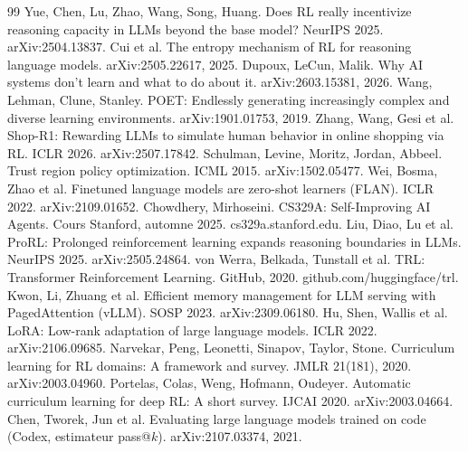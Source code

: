 \begin{thebibliography}{99}
 Yue, Chen, Lu, Zhao, Wang, Song, Huang. Does RL really incentivize reasoning capacity in LLMs beyond the base model? NeurIPS 2025. arXiv:2504.13837.
 Cui et al. The entropy mechanism of RL for reasoning language models. arXiv:2505.22617, 2025.
 Dupoux, LeCun, Malik. Why AI systems don't learn and what to do about it. arXiv:2603.15381, 2026.
 Wang, Lehman, Clune, Stanley. POET: Endlessly generating increasingly complex and diverse learning environments. arXiv:1901.01753, 2019.
 Zhang, Wang, Gesi et al. Shop-R1: Rewarding LLMs to simulate human behavior in online shopping via RL. ICLR 2026. arXiv:2507.17842.
 Schulman, Levine, Moritz, Jordan, Abbeel. Trust region policy optimization. ICML 2015. arXiv:1502.05477.
 Wei, Bosma, Zhao et al. Finetuned language models are zero-shot learners (FLAN). ICLR 2022. arXiv:2109.01652.
 Chowdhery, Mirhoseini. CS329A: Self-Improving AI Agents. Cours Stanford, automne 2025. cs329a.stanford.edu.
 Liu, Diao, Lu et al. ProRL: Prolonged reinforcement learning expands reasoning boundaries in LLMs. NeurIPS 2025. arXiv:2505.24864.
 von Werra, Belkada, Tunstall et al. TRL: Transformer Reinforcement Learning. GitHub, 2020. github.com/huggingface/trl.
 Kwon, Li, Zhuang et al. Efficient memory management for LLM serving with PagedAttention (vLLM). SOSP 2023. arXiv:2309.06180.
 Hu, Shen, Wallis et al. LoRA: Low-rank adaptation of large language models. ICLR 2022. arXiv:2106.09685.
 Narvekar, Peng, Leonetti, Sinapov, Taylor, Stone. Curriculum learning for RL domains: A framework and survey. JMLR 21(181), 2020. arXiv:2003.04960.
 Portelas, Colas, Weng, Hofmann, Oudeyer. Automatic curriculum learning for deep RL: A short survey. IJCAI 2020. arXiv:2003.04664.
 Chen, Tworek, Jun et al. Evaluating large language models trained on code (Codex, estimateur pass@$k$). arXiv:2107.03374, 2021.
\end{thebibliography}
